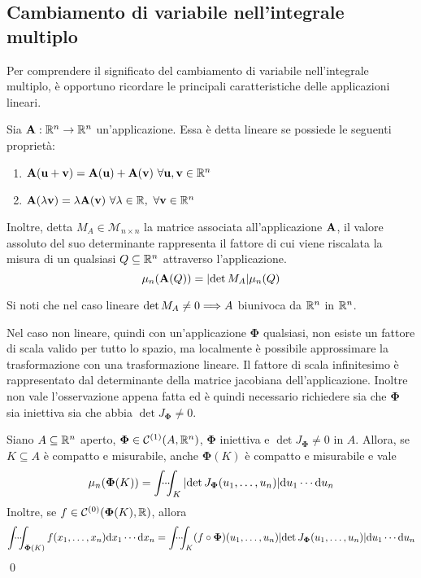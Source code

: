 \subsection{Cambiamento di variabile nell'integrale multiplo}

Per comprendere il significato del cambiamento di variabile nell'integrale multiplo, è opportuno ricordare le principali caratteristiche delle applicazioni lineari.

\begin{definition}
    Sia $\vb{A}:\mathbb{R}^n\to\mathbb{R}^n$ un'applicazione. Essa è detta lineare se possiede le seguenti proprietà:
    \begin{enumerate}
        \item $\vb{A}(\vb{u}+\vb{v})=\vb{A}(\vb{u})+\vb{A}(\vb{v}) \ \forall \vb{u},\vb{v}\in \mathbb{R}^n$
        \item $\vb{A}(\lambda\vb{v})=\lambda \vb{A}(\vb{v}) \ \forall \lambda \in \mathbb{R}, \ \forall \vb{v} \in \mathbb{R}^n$ 
    \end{enumerate}
    Inoltre, detta $M_A \in \mathcal{M}_{n\times n}$ la matrice associata all'applicazione $\vb{A}$, il valore assoluto del suo determinante rappresenta il fattore di cui viene riscalata la misura di un qualsiasi $Q\subseteq \mathbb{R}^n$ attraverso l'applicazione.
    $$\mu_n(\vb{A}(Q))=\abs{\det M_A}\mu_n(Q)$$
\end{definition}

\begin{remark}
    Si noti che nel caso lineare $\det M_A \neq 0 \Longrightarrow A$ biunivoca da $\mathbb{R}^n$ in $\mathbb{R}^n$.
\end{remark}

Nel caso non lineare, quindi con un'applicazione $\bm\Phi$ qualsiasi, non esiste un fattore di scala valido per tutto lo spazio, ma localmente è possibile approssimare la trasformazione con una trasformazione lineare. Il fattore di scala infinitesimo è rappresentato dal determinante della matrice jacobiana dell'applicazione. Inoltre non vale l'osservazione appena fatta ed è quindi necessario richiedere sia che $\bm\Phi$ sia iniettiva sia che abbia $\det J_{\bm\Phi} \neq 0$.

\begin{theorem}
    \label{thm:int_var}
    Siano $A \subseteq \mathbb{R}^n$ aperto, $\bm\Phi \in \mathcal{C}^{(1)}(A,\mathbb{R}^n)$, $\bm\Phi$ iniettiva e $\det J_{\bm\Phi} \neq 0$ in $A$. Allora, se $K \subseteq A$ è compatto e misurabile, anche $\bm\Phi(K)$ è compatto e misurabile e vale
    $$
        \mu_n(\bm\Phi(K))=\idotsint_K \abs{\det J_{\bm\Phi}(u_1,\dots,u_n)}\dd u_1 \cdots \dd u_n
    $$
    Inoltre, se $f \in \mathcal{C}^{(0)}(\bm\Phi(K),\mathbb{R})$, allora
    $$
        \idotsint_{\bm\Phi(K)}f(x_1,\dots,x_n)\dd x_1 \cdots \dd x_n=\idotsint_K (f \circ \bm\Phi)(u_1,\dots,u_n)\abs{\det J_{\bm\Phi}(u_1,\dots,u_n)}\dd u_1\cdots \dd u_n
    $$
    \qed
\end{theorem}

